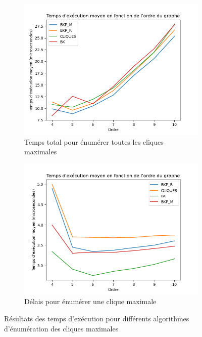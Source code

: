 \documentclass[12pt,a4paper]{article}
\begin{document}
\begin{figure}[h!]
    \centering
    \begin{subfigure}[b]{0.49\textwidth}
        \centering
        \includegraphics[width=\textwidth]{images/total_plot.png}
        \caption{Temps total pour énumérer toutes les cliques maximales}
        \label{fig:total_plot}
    \end{subfigure}
    \hfill
    \begin{subfigure}[b]{0.49\textwidth}
        \centering
        \includegraphics[width=\textwidth]{images/delay_plot.png}
        \caption{Délais pour énumérer une clique maximale}
        \label{fig:delay_plot}
    \end{subfigure}
    \caption{Résultats des temps d'exécution pour différents algorithmes d'énumération des cliques maximales}
    \label{fig:res1}
\end{figure}
\end{document}
